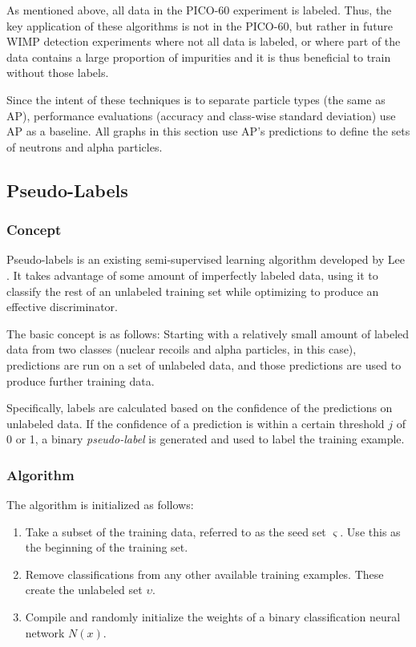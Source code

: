 \documentclass[10pt]{article}
\begin{document}
As mentioned above, all data in the PICO-60 experiment is labeled. Thus, the key application of these algorithms is not in the PICO-60, but rather in future WIMP detection experiments where not all data is labeled, or where part of the data contains a large proportion of impurities and it is thus beneficial to train without those labels.

Since the intent of these techniques is to separate particle types (the same as AP), performance evaluations (accuracy and class-wise standard deviation) use AP as a baseline. All graphs in this section use AP's predictions to define the sets of neutrons and alpha particles.

\subsection{Pseudo-Labels}

\subsubsection{Concept}

Pseudo-labels is an existing semi-supervised learning algorithm developed by Lee \cite{pseudo}. It takes advantage of some amount of imperfectly labeled data, using it to classify the rest of an unlabeled training set while optimizing to produce an effective discriminator.

The basic concept is as follows: Starting with a relatively small amount of labeled data from two classes (nuclear recoils and alpha particles, in this case), predictions are run on a set of unlabeled data, and those predictions are used to produce further training data.

Specifically, labels are calculated based on the confidence of the predictions on unlabeled data. If the confidence of a prediction is within a certain threshold $j$ of 0 or 1, a binary \textit{pseudo-label} is generated and used to label the training example.

\subsubsection{Algorithm}

The algorithm is initialized as follows:

\begin{enumerate}
    \item Take a subset of the training data, referred to as the seed set $\varsigma$. Use this as the beginning of the training set.
    \item Remove classifications from any other available training examples. These create the unlabeled set $\upsilon$.
    \item Compile and randomly initialize the weights of a binary classification neural network $N(x)$.
\end{enumerate}
\end{document}
